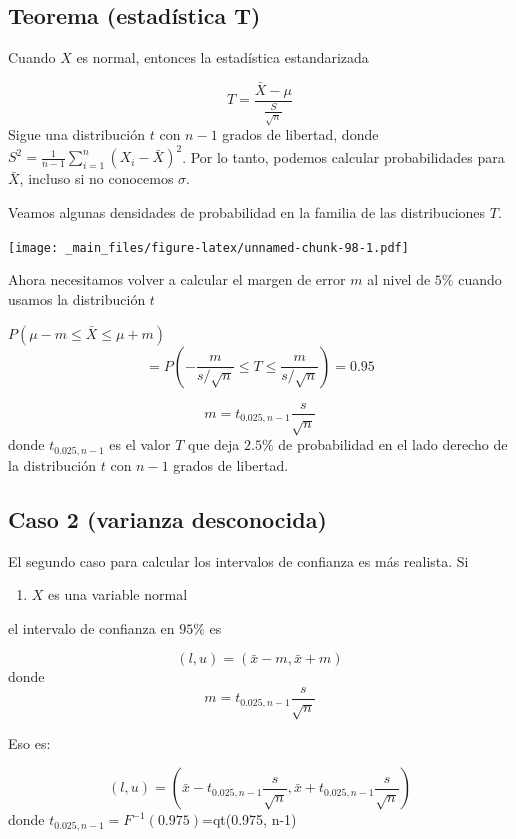 \documentclass[
]{book}
\providecommand{\tightlist}{%
  \setlength{\itemsep}{0pt}\setlength{\parskip}{0pt}}
\begin{document}
\hypertarget{teorema-estaduxedstica-t}{%
\subsection{Teorema (estadística T)}\label{teorema-estaduxedstica-t}}

Cuando \(X\) es normal, entonces la estadística estandarizada

\[T=\frac{\bar{X}-\mu}{\frac{S}{\sqrt{n}}}\]
Sigue una distribución \(t\) con \(n-1\) grados de libertad, donde \(S^2=\frac{1}{n-1} \sum_{i=1}^n (X_i-\bar{X})^2\). Por lo tanto, podemos calcular probabilidades para \(\bar{X}\), incluso si no conocemos \(\sigma\).

Veamos algunas densidades de probabilidad en la familia de las distribuciones \(T\).

\texttt{[image: \_main\_files/figure-latex/unnamed-chunk-98-1.pdf]}

Ahora necesitamos volver a calcular el margen de error \(m\) al nivel de \(5\%\) cuando usamos la distribución \(t\)

\(P(\mu-m \leq \bar{X} \leq\mu + m)\)
\[=P(-\frac{m}{s/\sqrt{n}} \leq T \leq\frac{m}{s/\sqrt{n}})=0.95\]

\[m=t_{0.025, n-1} \frac{s}{\sqrt{n}}\]
donde \(t_{0.025, n-1}\) es el valor \(T\) que deja \(2.5\%\) de probabilidad en el lado derecho de la distribución \(t\) con \(n-1\) grados de libertad.

\hypertarget{caso-2-varianza-desconocida}{%
\subsection{Caso 2 (varianza desconocida)}\label{caso-2-varianza-desconocida}}

El segundo caso para calcular los intervalos de confianza es más realista. Si

\begin{enumerate}
\def\labelenumi{\arabic{enumi}.}
\tightlist
\item
  \(X\) es una variable normal
\end{enumerate}

el intervalo de confianza en \(95\%\) es

\[(l,u)=(\bar{x} - m, \bar{x} + m)\]
donde \[m=t_{0.025, n-1} \frac{s}{\sqrt{n}}\]

Eso es:

\[(l,u)=(\bar{x} - t_{0.025, n-1} \frac{s}{\sqrt{n}}, \bar{x} + t_{0.025, n-1} \frac{s}{\sqrt{n}})\]
donde \(t_{0.025, n-1}=F^{-1}(0.975)\)=qt(0.975, n-1)
\end{document}

